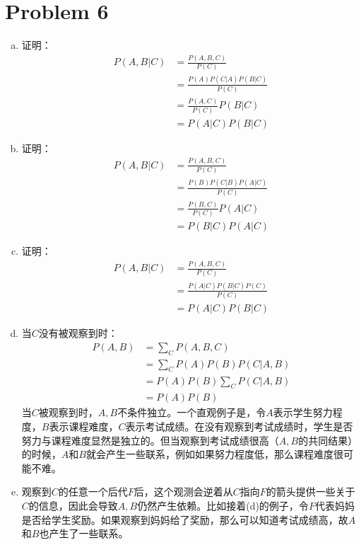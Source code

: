 \documentclass[a4paper,UTF8]{article}
\numberwithin{equation}{section}
\begin{document}
\section*{Problem 6}
\begin{enumerate}[(a)]
	\item 证明：\begin{align*}
	   P(A,B|C)&=\frac{P(A,B,C)}{P(C)}\\
	           &=\frac{P(A)P(C|A)P(B|C)}{P(C)}\\
	           &=\frac{P(A,C)}{P(C)}P(B|C)\\
	           &=P(A|C)P(B|C)
	      \end{align*}
	 \item 证明：\begin{align*}
	   P(A,B|C)&=\frac{P(A,B,C)}{P(C)}\\
	           &=\frac{P(B)P(C|B)P(A|C)}{P(C)}\\
	           &=\frac{P(B,C)}{P(C)}P(A|C)\\
	           &=P(B|C)P(A|C)
	      \end{align*}
     \item 证明：\begin{align*}
	   P(A,B|C)&=\frac{P(A,B,C)}{P(C)}\\
	           &=\frac{P(A|C)P(B|C)P(C)}{P(C)}\\
	           &=P(A|C)P(B|C)
	      \end{align*}
	  \item 当$C$没有被观察到时：\begin{align*}
	   P(A,B)&=\sum_C{P(A,B,C)}\\
	         &=\sum_C P(A)P(B)P(C|A,B)\\
	         &=P(A)P(B)\sum_C P(C|A,B)\\
	         &=P(A)P(B)
	      \end{align*}
	      当$C$被观察到时，$A,B$不条件独立。一个直观例子是，令$A$表示学生努力程度，$B$表示课程难度，$C$表示考试成绩。在没有观察到考试成绩时，学生是否努力与课程难度显然是独立的。但当观察到考试成绩很高（$A,B$的共同结果）的时候，$A$和$B$就会产生一些联系，例如如果努力程度低，那么课程难度很可能不难。
	  \item 观察到$C$的任意一个后代$F$后，这个观测会逆着从$C$指向$F$的箭头提供一些关于$C$的信息，因此会导致$A,B$仍然产生依赖。比如接着(d)的例子，令$F$代表妈妈是否给学生奖励。如果观察到妈妈给了奖励，那么可以知道考试成绩高，故$A$和$B$也产生了一些联系。
\end{enumerate}
\end{document}
